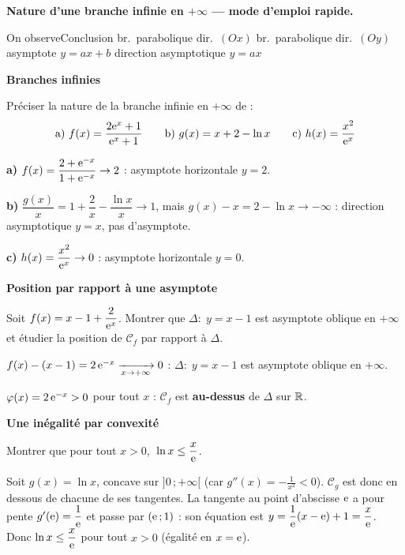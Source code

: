 \begin{methode}
	\textbf{Nature d'une branche infinie en $+\infty$ — mode d'emploi rapide.}
	\begin{tabmethode}[0.52]{On observe}{Conclusion}
		      {br.\ parabolique dir.\ $(Ox)$}
		      {br.\ parabolique dir.\ $(Oy)$}
		      {asymptote $y=ax+b$}
		      {direction asymptotique $y=ax$}
	\end{tabmethode}
\end{methode}

\exerciceresolu
\textbf{Branches infinies}

Préciser la nature de la branche infinie en $+\infty$ de :
\[
\text{a) } f(x)=\frac{2\mathrm{e}^{x}+1}{\mathrm{e}^{x}+1}
\qquad
\text{b) } g(x)=x+2-\ln x
\qquad
\text{c) } h(x)=\frac{x^{2}}{\mathrm{e}^{x}}
\]

\solution

\textbf{a)} $f(x)=\dfrac{2+\mathrm{e}^{-x}}{1+\mathrm{e}^{-x}}\to 2$ : asymptote horizontale
$y=2$.

\textbf{b)} $\dfrac{g(x)}{x}=1+\dfrac{2}{x}-\dfrac{\ln x}{x}\to 1$, mais
$g(x)-x=2-\ln x\to-\infty$ : direction asymptotique $y=x$, pas d'asymptote.

\textbf{c)} $h(x)=\dfrac{x^{2}}{\mathrm{e}^{x}}\to 0$ : asymptote horizontale $y=0$.

\bigskip
\exerciceresolu
\textbf{Position par rapport à une asymptote}

Soit $f(x)=x-1+\dfrac{2}{\mathrm{e}^{x}}$. Montrer que $\Delta:\;y=x-1$ est
asymptote oblique en $+\infty$ et étudier la position de $\mathcal C_f$ par
rapport à $\Delta$.

\solution

$f(x)-(x-1)=2\,\mathrm{e}^{-x}\xrightarrow[x\to+\infty]{}0$ : $\Delta:\;y=x-1$ est
asymptote oblique en $+\infty$.

$\varphi(x)=2\,\mathrm{e}^{-x}>0$ pour tout $x$ : $\mathcal C_f$ est \textbf{au-dessus}
de $\Delta$ sur $\mathbb{R}$.

\bigskip
\exerciceresolu
\textbf{Une inégalité par convexité}

Montrer que pour tout $x>0$, $\;\ln x\leq \dfrac{x}{\mathrm{e}}$.

\solution

Soit $g(x)=\ln x$, concave sur $]0\,;+\infty[$ (car $g''(x)=-\tfrac{1}{x^{2}}<0$).
$\mathcal C_g$ est donc en dessous de chacune de ses tangentes. La tangente
au point d'abscisse $\mathrm{e}$ a pour pente $g'(\mathrm{e})=\dfrac{1}{\mathrm{e}}$ et passe par
$(\mathrm{e}\,;1)$ : son équation est $y=\dfrac{1}{\mathrm{e}}(x-\mathrm{e})+1=\dfrac{x}{\mathrm{e}}$.
Donc $\ln x\leq \dfrac{x}{\mathrm{e}}$ pour tout $x>0$ (égalité en $x=\mathrm{e}$).


